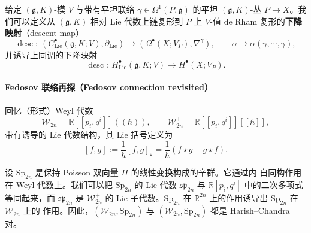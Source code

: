 
给定 $(\mathfrak{g},K)$-模 $V$ 与带有平坦联络 $\gamma\in\Omega^1(P,\mathfrak{g})$
的平坦 $(\mathfrak{g},K)$-丛 $P\to X$。我们可以定义从 $(\mathfrak{g},K)$ 相对 Lie
代数上链复形到 $P$ 上 $V$-值 de Rham 复形的\textbf{下降映射}（descent map）
\[
  \operatorname{desc}:\ \left(C^\bullet_{\mathrm{Lie}}(\mathfrak{g},K;V),
  \partial_{\mathrm{Lie}}\right)\longrightarrow\left(\Omega^\bullet(X;V_P),\nabla^\gamma\right),
  \qquad \alpha\mapsto\alpha(\gamma,\cdots,\gamma),
\]
并诱导上同调的下降映射
\[
  \operatorname{desc}:\ H^\bullet_{\mathrm{Lie}}(\mathfrak{g},K;V)
  \longrightarrow H^\bullet(X;V_P).
\]


\paragraph*{Fedosov 联络再探（Fedosov connection revisited）}

回忆（形式）Weyl 代数
\[
  \mathcal{W}_{2n}=\mathbb{R}[[p_i,q^i]]((\hbar)),\qquad
  \mathcal{W}^+_{2n}=\mathbb{R}[[p_i,q^i]][[\hbar]],
\]
带有诱导的 Lie 代数结构，其 Lie 括号定义为
\[
  [f,g]:=\frac{1}{\hbar}[f,g]_\star=\frac{1}{\hbar}(f\star g-g\star f).
\]


设 $\mathrm{Sp}_{2n}$ 是保持 Poisson 双向量 $\Pi$ 的线性变换构成的辛群。它通过内
自同构作用在 Weyl 代数上。我们可以把 $\mathrm{Sp}_{2n}$ 的 Lie 代数
$\mathfrak{sp}_{2n}$ 与 $\mathbb{R}[p_i,q^i]$ 中的二次多项式等同起来，而
$\mathfrak{sp}_{2n}$ 是 $\mathcal{W}^+_{2n}$ 的 Lie 子代数。$\mathrm{Sp}_{2n}$ 在
$\mathbb{R}^{2n}$ 上的作用诱导出 $\mathrm{Sp}_{2n}$ 在 $\mathcal{W}^+_{2n}$ 上的
作用。因此，$(\mathcal{W}^+_{2n},\mathrm{Sp}_{2n})$ 与
$(\mathcal{W}_{2n},\mathrm{Sp}_{2n})$ 都是 Harish--Chandra 对。

